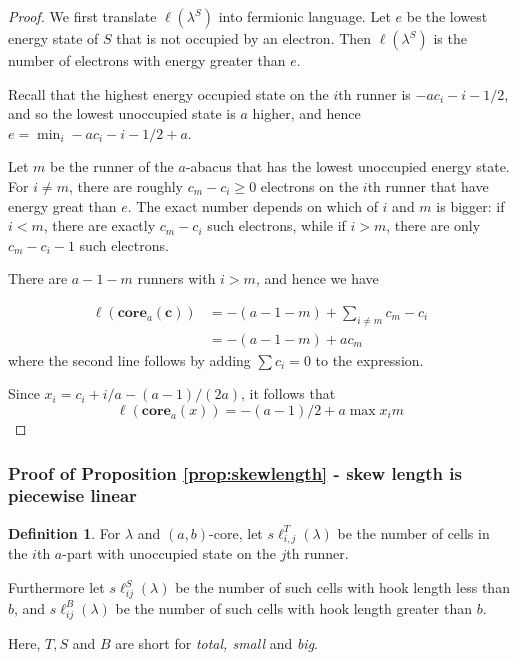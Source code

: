 \documentclass{amsart}[12pt]
\theoremstyle{definition}
\newtheorem{definition}[dummy]{Definition}
\newcommand{\core}{\mathbf{core}}
\newcommand{\sk}{s\ell}
\begin{document}
\begin{proof}
We first translate $\ell(\lambda^S)$ into fermionic language.
Let $e$ be the lowest energy state of $S$ that is not occupied by an electron.  Then $\ell(\lambda^S)$ is the number of electrons with energy greater than $e$.

Recall that the highest energy occupied state on the $i$th runner is $-ac_i-i-1/2$, and so the lowest unoccupied state is $a$ higher, and hence $e=\min_i -ac_i-i-1/2+a$.  

Let $m$ be the runner of the $a$-abacus that has the lowest unoccupied energy state.  For $i\neq m$, there are roughly $c_m-c_i\geq 0 $ electrons on the $i$th runner that have energy great than $e$.  The exact number depends  on which of $i$ and $m$ is bigger: if $i<m$, there are exactly $c_m-c_i$ such electrons, while if $i>m$, there are only $c_m-c_i-1$ such electrons. 

 There are $a-1-m$ runners with $i>m$, and hence we have

\begin{align*}
\ell(\core_a(\mathbf{c})) & =-(a-1-m)+\sum_{i\neq m} c_m-c_i \\
 &=-(a-1-m)+ac_m
 \end{align*}
 where the second line follows by adding $\sum c_i=0$ to the expression.

Since $x_i=c_i+i/a-(a-1)/(2a)$, it follows that
$$
\ell(\core_a(x))= -(a-1)/2+a\max x_i m
$$

\end{proof}





\subsubsection{Proof of Proposition \ref{prop:skewlength} - skew length is piecewise linear}





\begin{definition} \label{def:skewij}
For $\lambda$ and $(a,b)$-core, let $\sk^T_{i,j}(\lambda)$ be the number of cells in the $i$th $a$-part with unoccupied state on the $j$th runner.

Furthermore let $\sk_{ij}^S(\lambda)$ be the number of such cells with hook length less than $b$, and $\sk_{ij}^B(\lambda)$ be the number of such cells with hook length greater than $b$.
 
Here, $T, S$ and $B$ are short for \emph{total, small} and \emph{big}.
\end{definition}
\end{document}
